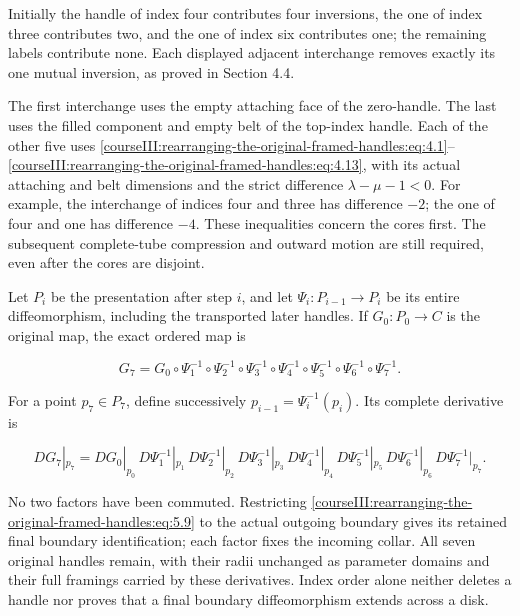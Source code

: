 Initially the handle of index four contributes four inversions, the one of index three contributes two, and the one of index six contributes one; the remaining labels contribute none. Each displayed adjacent interchange removes exactly its one mutual inversion, as proved in Section 4.4.

The first interchange uses the empty attaching face of the zero-handle. The last uses the filled component and empty belt of the top-index handle. Each of the other five uses \eqref{courseIII:rearranging-the-original-framed-handles:eq:4.1}--\eqref{courseIII:rearranging-the-original-framed-handles:eq:4.13}, with its actual attaching and belt dimensions and the strict difference \(\lambda-\mu-1<0\). For example, the interchange of indices four and three has difference \(-2\); the one of four and one has difference \(-4\). These inequalities concern the cores first. The subsequent complete-tube compression and outward motion are still required, even after the cores are disjoint.

Let \(P_i\) be the presentation after step \(i\), and let
\(\Psi_i:P_{i-1}\to P_i\) be its entire diffeomorphism, including the transported later handles. If \(G_0:P_0\to C\) is the original map, the exact ordered map is

\begin{equation}
G_7
=G_0\circ\Psi_1^{-1}\circ\Psi_2^{-1}
       \circ\Psi_3^{-1}\circ\Psi_4^{-1}
       \circ\Psi_5^{-1}\circ\Psi_6^{-1}
       \circ\Psi_7^{-1}.
\label{courseIII:rearranging-the-original-framed-handles:eq:5.9}
\end{equation}

For a point \(p_7\in P_7\), define successively \(p_{i-1}=\Psi_i^{-1}(p_i)\). Its complete derivative is

\begin{equation}
DG_7|_{p_7}
=DG_0|_{p_0}\,
 D\Psi_1^{-1}|_{p_1}\,
 D\Psi_2^{-1}|_{p_2}\,
 D\Psi_3^{-1}|_{p_3}\,
 D\Psi_4^{-1}|_{p_4}\,
 D\Psi_5^{-1}|_{p_5}\,
 D\Psi_6^{-1}|_{p_6}\,
 D\Psi_7^{-1}|_{p_7}.
\label{courseIII:rearranging-the-original-framed-handles:eq:5.10}
\end{equation}

No two factors have been commuted. Restricting \eqref{courseIII:rearranging-the-original-framed-handles:eq:5.9} to the actual outgoing boundary gives its retained final boundary identification; each factor fixes the incoming collar. All seven original handles remain, with their radii unchanged as parameter domains and their full framings carried by these derivatives. Index order alone neither deletes a handle nor proves that a final boundary diffeomorphism extends across a disk.

